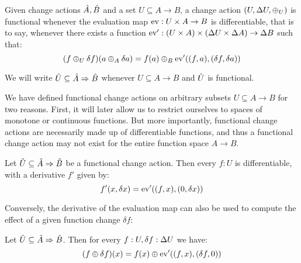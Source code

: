 \begin{defn}
  \label{def:functionalChanges}
  Given change actions $\hat{A}, \hat{B}$ and a set $U \subseteq A \rightarrow B$, a change action
  $(U, \Delta U, \oplus_U)$ is functional whenever the evaluation map $\operatorname{ev} : U \times A \rightarrow B$
  is differentiable, that is to say, whenever there exists a function 
  $\operatorname{ev}' : (U \times A) \times (\Delta U \times \Delta A) \rightarrow \Delta B$ such that:
  \begin{displaymath}
    (f \oplus_U \delta f)(a \oplus_A \delta a) = 
    f(a) \oplus_B \operatorname{ev}'((f, a), (\delta f, \delta a))
  \end{displaymath}
  
  We will write $\hat{U} \subseteq \hat{A} \Rightarrow \hat{B}$ whenever 
  $U \subseteq A \rightarrow B$ and $\hat{U}$ is functional.
\end{defn}

We have defined functional change actions on arbitrary subsets $U \subseteq A \rightarrow B$ for two
reasons. First, it will later allow us to restrict ourselves to spaces of monotone or continuous
functions. But more importantly, functional change actions are necessarily made up of differentiable
functions, and thus a functional change action may not exist for the entire function space
$A \rightarrow B$.

\begin{prop}
  \label{prop:differentiableFunctionalChanges}
  Let $\hat{U} \subseteq \hat{A} \Rightarrow \hat{B}$ be a functional change action. Then every 
  $f : U$ is differentiable, with a derivative $f'$ given by:
  \begin{displaymath}
    f'(x, \delta x) = \operatorname{ev}'((f, x), (0, \delta x))
  \end{displaymath}
\end{prop}

Conversely, the derivative of the evaluation map can also be used to compute the effect of a given
function change $\delta f$:
\begin{prop}
  Let $\hat{U} \subseteq \hat{A} \Rightarrow \hat{B}$. Then for every $f : U, \delta f : \Delta U$
  we have:
  \begin{displaymath}
    (f \oplus \delta f)(x) = f(x) \oplus \operatorname{ev}'((f, x), (\delta f, 0))
  \end{displaymath}
\end{prop}

